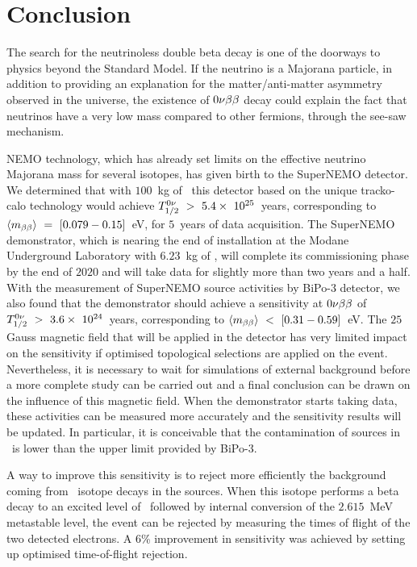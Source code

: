 \chapter*{Conclusion}
\label{ch:conclu}

The search for the neutrinoless double beta decay is one of the doorways to physics beyond the Standard Model.
If the neutrino is a Majorana particle, in addition to providing an explanation for the matter/anti-matter asymmetry observed in the universe, the existence of $0\nu\beta\beta$ decay could explain the fact that neutrinos have a very low mass compared to other fermions, through the see-saw mechanism.

NEMO technology, which has already set limits on the effective neutrino Majorana mass for several isotopes, has given birth to the SuperNEMO detector.
We determined that with $100$~kg of \Se\ this detector based on the unique tracko-calo technology would achieve $T_{1/2}^{0\nu}~>~5.4\times~10^{25}$~years, corresponding to $\langle m_{\beta\beta}\rangle~=~[0.079-0.15]$~eV, for $5$~years of data acquisition.
The SuperNEMO demonstrator, which is nearing the end of installation at the Modane Underground Laboratory with $6.23$~kg of \Se, will complete its commissioning phase by the end of $2020$ and will take data for slightly more than two years and a half.
With the measurement of SuperNEMO source activities by BiPo-$3$ detector, we also found that the demonstrator should achieve a sensitivity at $0\nu\beta\beta$ of $T_{1/2}^{0\nu}~>~3.6\times~10^{24}$~years, corresponding to $\langle m_{\beta\beta}\rangle~<~[0.31-0.59]$~eV.
The $25$ Gauss magnetic field that will be applied in the detector has very limited impact on the sensitivity if optimised topological selections are applied on the event.
Nevertheless, it is necessary to wait for simulations of external background before a more complete study can be carried out and a final conclusion can be drawn on the influence of this magnetic field.
When the demonstrator starts taking data, these activities can be measured more accurately and the sensitivity results will be updated.
In particular, it is conceivable that the contamination of sources in \Bi\ is lower than the upper limit provided by BiPo-$3$.

A way to improve this sensitivity is to reject more efficiently the background coming from \Tl\ isotope decays in the sources.
When this isotope performs a beta decay to an excited level of \Pb\ followed by internal conversion of the $2.615$~MeV metastable level, the event can be rejected by measuring the times of flight of the two detected electrons.
A 6\% improvement in sensitivity was achieved by setting up optimised time-of-flight rejection.

